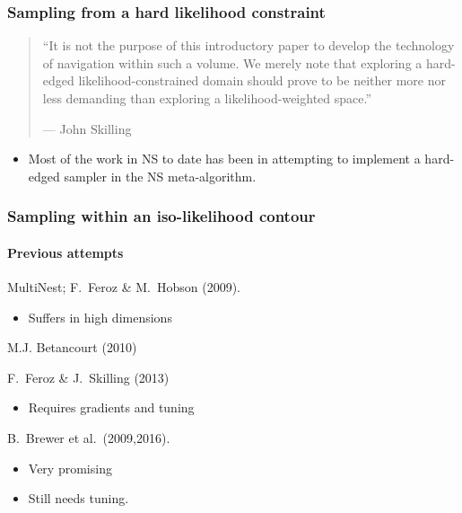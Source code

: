 \documentclass[%
]{beamer}
\begin{document}
\begin{frame}
  \frametitle{Sampling from a hard likelihood constraint} 

  \pause
  \begin{quote}
    ``It is not the purpose of this introductory paper to develop the technology of navigation within such a volume. We merely note that exploring a hard-edged likelihood-constrained domain should prove to be neither more nor less demanding than exploring a likelihood-weighted space.''
    
   {\hfill --- John Skilling}
  \end{quote}

  \begin{itemize}
      \pause
    \item Most of the work in NS to date has been in attempting to implement a hard-edged sampler in the NS meta-algorithm.
  \end{itemize}
 
\end{frame}


\begin{frame}
  \frametitle{Sampling within an iso-likelihood contour}
  \framesubtitle{Previous attempts}


  \begin{description}
    \pause\item[Rejection Sampling] MultiNest; F.\ Feroz \& M.\ Hobson (2009).
      \begin{itemize}
        \pause\item Suffers in high dimensions
      \end{itemize}
      \pause\item[Hamiltonian] M.J. Betancourt (2010) 
      \pause\item[Galilean] F.\ Feroz \& J.\ Skilling (2013) 
      \begin{itemize}
        \pause\item Requires gradients and tuning
      \end{itemize}
      \pause\item[Diffusive Nested Sampling] B.\ Brewer et al.\ (2009,2016).
      \begin{itemize}
        \pause\item Very promising
        \pause\item Still needs tuning.
      \end{itemize}
  \end{description}

\end{frame}
\end{document}
